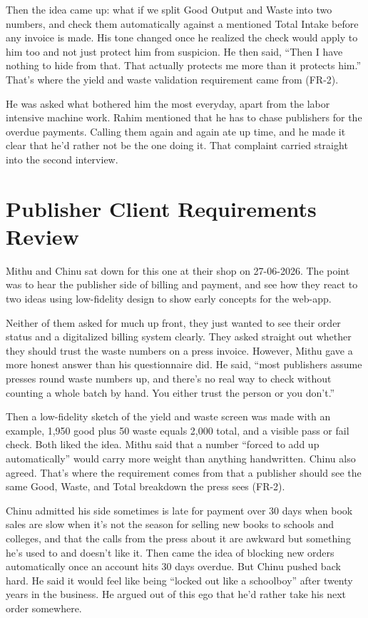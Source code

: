 \documentclass{scrreprt}
\begin{document}
Then the idea came up: what if we split Good Output and Waste into two numbers, and check them automatically against a mentioned Total Intake before any invoice is made. His tone changed once he realized the check would apply to him too and not just protect him from suspicion. He then said, ``Then I have nothing to hide from that. That actually protects me more than it protects him.'' That's where the yield and waste validation requirement came from (FR-2).

He was asked what bothered him the most everyday, apart from the labor intensive machine work. Rahim mentioned that he has to chase publishers for the overdue payments. Calling them again and again ate up time, and he made it clear that he'd rather not be the one doing it. That complaint carried straight into the second interview.

\section{Publisher Client Requirements Review}
Mithu and Chinu sat down for this one at their shop on 27-06-2026. The point was to hear the publisher side of billing and payment, and see how they react to two ideas using low-fidelity design to show early concepts for the web-app.

Neither of them asked for much up front, they just wanted to see their order status and a digitalized billing system clearly. They asked straight out whether they should trust the waste numbers on a press invoice. However, Mithu gave a more honest answer than his questionnaire did. He said, ``most publishers assume presses round waste numbers up, and there's no real way to check without counting a whole batch by hand. You either trust the person or you don't.''

Then a low-fidelity sketch of the yield and waste screen was made with an example, 1,950 good plus 50 waste equals 2,000 total, and a visible pass or fail check. Both liked the idea. Mithu said that a number ``forced to add up automatically'' would carry more weight than anything handwritten. Chinu also agreed. That's where the requirement comes from that a publisher should see the same Good, Waste, and Total breakdown the press sees (FR-2).

Chinu admitted his side sometimes is late for payment over 30 days when book sales are slow when it's not the season for selling new books to schools and colleges, and that the calls from the press about it are awkward but something he's used to and doesn't like it. Then came the idea of blocking new orders automatically once an account hits 30 days overdue. But Chinu pushed back hard. He said it would feel like being ``locked out like a schoolboy'' after twenty years in the business. He argued out of this ego that he'd rather take his next order somewhere.
\end{document}
